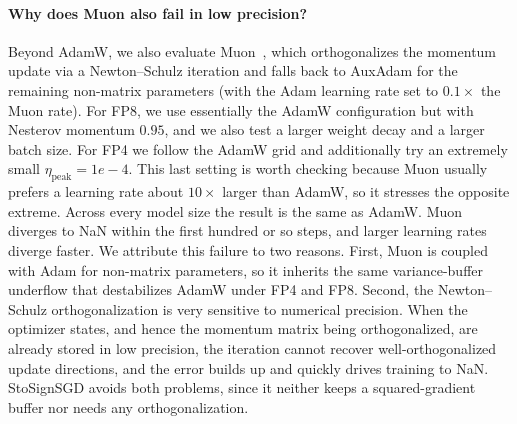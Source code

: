 \documentclass{article}
\begin{document}
\paragraph{Why does Muon also fail in low precision?}
Beyond AdamW, we also evaluate Muon~\citep{jordan2024muon,liu2025muon}, which orthogonalizes the momentum update via a Newton--Schulz iteration and falls back to AuxAdam for the remaining non-matrix parameters (with the Adam learning rate set to $0.1\times$ the Muon rate). For FP8, we use essentially the AdamW configuration but with Nesterov momentum $0.95$, and we also test a larger weight decay and a larger batch size. For FP4 we follow the AdamW grid and additionally try an extremely small $\eta_\text{peak}=1e-4$. This last setting is worth checking because Muon usually prefers a learning rate about $10\times$ larger than AdamW, so it stresses the opposite extreme. Across every model size the result is the same as AdamW. Muon diverges to NaN within the first hundred or so steps, and larger learning rates diverge faster. We attribute this failure to two reasons. First, Muon is coupled with Adam for non-matrix parameters, so it inherits the same variance-buffer underflow that destabilizes AdamW under FP4 and FP8. Second, the Newton--Schulz orthogonalization is very sensitive to numerical precision. When the optimizer states, and hence the momentum matrix being orthogonalized, are already stored in low precision, the iteration cannot recover well-orthogonalized update directions, and the error builds up and quickly drives training to NaN. StoSignSGD avoids both problems, since it neither keeps a squared-gradient buffer nor needs any orthogonalization.
\end{document}
